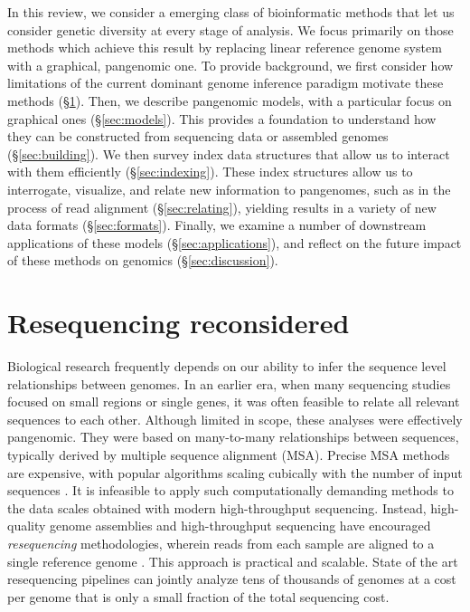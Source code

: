 In this review, we consider a emerging class of bioinformatic methods that let us consider genetic diversity at every stage of analysis.
We focus primarily on those methods which achieve this result by replacing linear reference genome system with a graphical, pangenomic one.
To provide background, we first consider how limitations of the current dominant genome inference paradigm motivate these methods (\S \ref{sec:resequencing}).
Then, we describe pangenomic models, with a particular focus on graphical ones (\S \ref{sec:models}).
This provides a foundation to understand how they can be constructed from sequencing data or assembled genomes (\S \ref{sec:building}).
We then survey index data structures that allow us to interact with them efficiently (\S \ref{sec:indexing}).
These index structures allow us to interrogate, visualize, and relate new information to pangenomes, such as in the process of read alignment (\S \ref{sec:relating}), yielding results in a variety of new data formats (\S \ref{sec:formats}).
Finally, we examine a number of downstream applications of these models (\S \ref{sec:applications}), and reflect on the future impact of these methods on genomics (\S \ref{sec:discussion}).

\section{Resequencing reconsidered}
\label{sec:resequencing}

Biological research frequently depends on our ability to infer the sequence level relationships between genomes.
In an earlier era, when many sequencing studies focused on small regions or single genes, it was often feasible to relate all relevant sequences to each other.
Although limited in scope, these analyses were effectively pangenomic.
They were based on many-to-many relationships between sequences, typically derived by multiple sequence alignment (MSA).
Precise MSA methods are expensive, with popular algorithms scaling cubically with the number of input sequences \cite{notredame2000t}.
It is infeasible to apply such computationally demanding methods to the data scales obtained with modern high-throughput sequencing.
Instead, high-quality genome assemblies and high-throughput sequencing have encouraged \emph{resequencing} methodologies, wherein reads from each sample are aligned to a single reference genome \cite{stratton2008genome}.
This approach is practical and scalable.
State of the art resequencing pipelines can jointly analyze tens of thousands of genomes \cite{Poplin_2017} at a cost per genome that is only a small fraction of the total sequencing cost.

